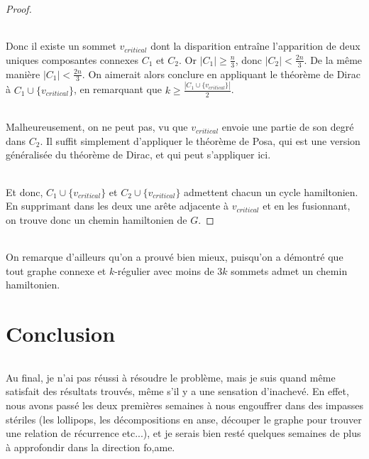 \documentclass[a4paper]{article}
\theoremstyle{definition}
\theoremstyle{remark}
\begin{document}
\begin{proof}
\paragraph{}
Donc il existe un sommet $v_{critical}$ dont la disparition entraîne
l'apparition de deux uniques composantes connexes $C_{1}$ et $C_{2}$.
Or $|C_{1}| \geq \frac{n}{3}$, donc $|C_{2}| < \frac{2n}{3}$. De la même
manière $|C_{1}| < \frac{2n}{3}$. On aimerait alors conclure en 
appliquant le théorème de Dirac à $C_{1} \cup \{v_{critical}\}$, en remarquant que $k \geq \frac{|C_{1} \cup \{v_{critical}\}|}{2}$. 

\paragraph{}
Malheureusement, on ne peut pas, vu que $v_{critical}$ envoie une partie
de son degré dans $C_{2}$. Il suffit simplement d'appliquer le théorème
de Posa, qui est une version généralisée du théorème de Dirac, et qui 
peut s'appliquer ici.


\paragraph{}
Et donc, $C_{1} \cup \{v_{critical}\}$ et $C_{2} \cup \{v_{critical}\}$ 
admettent chacun un cycle hamiltonien. En supprimant dans les deux une
arête adjacente à $v_{critical}$ et en les fusionnant, on trouve donc un 
chemin hamiltonien de $G$.
\end{proof}

\paragraph{}
On remarque d'ailleurs qu'on a prouvé bien mieux, puisqu'on a démontré que tout graphe connexe et $k$-régulier avec moins de $3k$ sommets admet un chemin hamiltonien. 

\part{Conclusion}
\paragraph{}
Au final, je n'ai pas réussi à résoudre le problème, mais je suis quand même satisfait des résultats trouvés, même s'il y a une sensation 
d'inachevé. En effet, nous avons passé les deux premières semaines à 
nous engouffrer dans des impasses stériles (les lollipops, les 
décompositions en anse, découper le graphe pour trouver une relation de récurrence etc...), et je serais bien resté quelques semaines de plus à 
approfondir dans la direction fo,ame.
\end{document}
